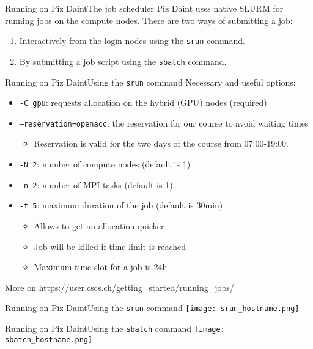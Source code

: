 \begin{frame}{Running on Piz Daint}{The job scheduler}
  Piz Daint uses native SLURM for running jobs on the compute nodes.
  There are two ways of submitting a job:
  \vspace\baselineskip
  \begin{enumerate}
  \item Interactively from the login nodes using the \texttt{srun} command.
  \item By submitting a job script using the \texttt{sbatch} command.
  \end{enumerate}
\end{frame}

\begin{frame}[fragile]{Running on Piz Daint}{Using the \texttt{srun} command}
  Necessary and useful options:
  \begin{itemize}
  \item \texttt{-C gpu}: requests allocation on the hybrid (GPU) nodes (required)
  \item \texttt{--reservation=openacc}: the reservation for our course to avoid waiting times
    \begin{itemize}
    \item Reservation is valid for the two days of the course from 07:00-19:00.
    \end{itemize}
  \item \texttt{-N 2}: number of compute nodes (default is 1)
  \item \texttt{-n 2}: number of MPI tasks (default is 1)
  \item \texttt{-t 5}: maximum duration of the job (default is 30min)
    \begin{itemize}
    \item Allows to get an allocation quicker
    \item Job will be killed if time limit is reached
    \item Maximum time slot for a job is 24h
    \end{itemize}
  \end{itemize}
  More on \url{https://user.cscs.ch/getting_started/running_jobs/}
\end{frame}

\begin{frame}[fragile]{Running on Piz Daint}{Using the \texttt{srun} command}
  {
    \centering
    \texttt{[image: srun\_hostname.png]}
  }
\end{frame}

\begin{frame}[fragile]{Running on Piz Daint}{Using the \texttt{sbatch} command}
  {
    \centering
    \texttt{[image: sbatch\_hostname.png]}
  }
\end{frame}


